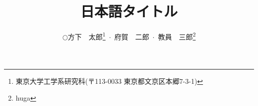 


\title{日本語タイトル}

\newcommand{\belonga}{東京大学工学系研究科\newline (〒113-0033 東京都文京区本郷7-3-1)}

\newcommand{\belongb}{huga}

\author{$\bigcirc$方下　太郎\footnote{\belonga}\ $\cdot$\
府賀　二郎\footnotemark[1] \ $\cdot$\
教員　三郎\footnote{\belongb}}




\pagestyle{empty}



\maketitle







